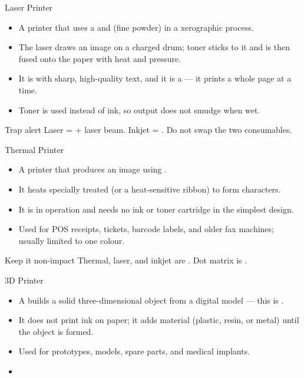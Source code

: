 \documentclass[aspectratio=169]{beamer}
\begin{document}
\begin{frame}{Laser Printer}
  \begin{itemize}
    \item A  printer that uses a  and
       (fine powder) in a xerographic process.
    \item The laser draws an image on a charged drum; toner sticks to it and
      is then fused onto the paper with heat and pressure.
    \item It is  with sharp, high-quality text, and it is a
       --- it prints a whole page at a time.
    \item Toner is used instead of ink, so output does not smudge when wet.
  \end{itemize}
  \begin{alertblock}{Trap alert}
    Laser =  + laser beam. Inkjet = . Do not swap
    the two consumables.
  \end{alertblock}
\end{frame}

\begin{frame}{Thermal Printer}
  \begin{itemize}
    \item A  printer that produces an image using .
    \item It heats specially treated  (or a heat-sensitive
      ribbon) to form characters.
    \item It is  in operation and needs no ink or toner
      cartridge in the simplest design.
    \item Used for POS receipts, tickets, barcode labels, and older fax
      machines; usually limited to one colour.
  \end{itemize}
  \begin{block}{Keep it non-impact}
    Thermal, laser, and inkjet are . Dot matrix is
    .
  \end{block}
\end{frame}

\begin{frame}{3D Printer}
  \begin{itemize}
    \item A  builds a solid three-dimensional object
       from a digital model --- this is
      .
    \item It does not print ink on paper; it adds material (plastic, resin,
      or metal) until the object is formed.
    \item Used for prototypes, models, spare parts, and medical implants.
    \item {}
  \end{itemize}
\end{frame}
\end{document}
